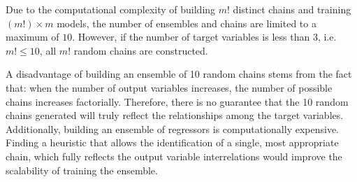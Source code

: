 \documentclass[reqno]{vcuthesis}
\numberwithin{equation}{chapter}
\begin{document}
Due to the computational complexity of building $m!$ distinct chains and training $\left(m!\right) \times m$ models, the number of ensembles and chains are limited to a maximum of $10$. However, if the number of target variables is less than $3$, i.e. $m! \leq 10$, all $m!$ random chains are constructed. 

A disadvantage of building an ensemble of 10 random chains stems from the fact that: when the number of output variables increases, the number of possible chains increases factorially. Therefore, there is no guarantee that the 10 random chains generated will truly reflect the relationships among the target variables. Additionally, building an ensemble of regressors is computationally expensive. Finding a heuristic that allows the identification of a single, most appropriate chain, which fully reflects the output variable interrelations would improve the scalability of training the ensemble. 

\newpage
\end{document}
